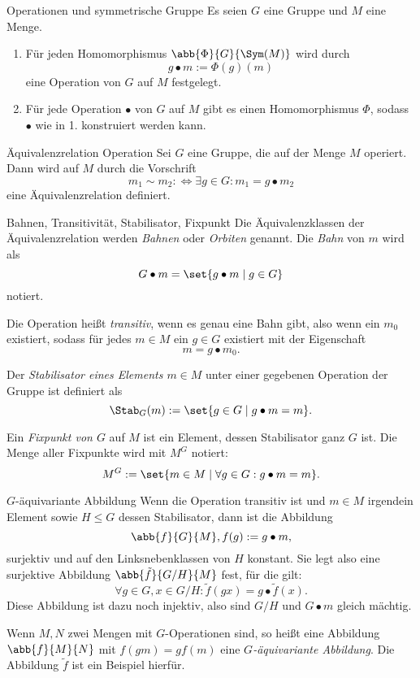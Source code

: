 \begin{karte}{Operationen und symmetrische Gruppe}
    Es seien \(G\) eine Gruppe und \(M\) eine Menge. 
    \begin{enumerate}
        \item Für jeden Homomorphismus \(\abb{\Phi}{G}{\Sym(M)}\) 
        wird durch 
        \[ g\bullet m := \Phi(g)(m) \]
        eine Operation von \(G\) auf \(M\) festgelegt. 
        \item Für jede Operation \(\bullet \) von 
        \(G\) auf \(M\) gibt es einen Homomorphismus \(\Phi\), 
        sodass \(\bullet\) wie in 1. konstruiert werden kann.
    \end{enumerate}
\end{karte}

\begin{karte}{Äquivalenzrelation Operation}
    Sei \(G\) eine Gruppe, die auf der Menge \(M\) operiert. Dann wird auf 
    \(M\) durch die Vorschrift 
    \[ m_1 \sim m_2 :\Leftrightarrow \exists g\in G: m_1 = g\bullet m_2 \]
    eine Äquivalenzrelation definiert.
\end{karte}

\begin{karte}{Bahnen, Transitivität, Stabilisator, Fixpunkt}
    Die Äquivalenzklassen der Äquivalenzrelation werden 
    \textit{Bahnen} oder \textit{Orbiten} genannt. Die \textit{Bahn} 
    von \(m\) wird als 
    \[ G\bullet m = \set{g\bullet m \;|\; g\in G} \]
    notiert.

    Die Operation heißt \textit{transitiv}, wenn es genau eine Bahn gibt, 
    also wenn ein \(m_0\) existiert, sodass für jedes \(m\in M\) ein 
    \(g\in G\) existiert mit der Eigenschaft 
    \[ m = g\bullet m_0. \]

    Der \textit{Stabilisator eines Elements \(m\in M\)} unter 
    einer gegebenen Operation der Gruppe ist definiert als 
    \[ \Stab_G(m) := \set{g\in G \;|\; g\bullet m = m}. \]

    Ein \textit{Fixpunkt von \(G\)} auf \(M\) ist ein Element, 
    dessen Stabilisator ganz \(G\) ist. Die Menge aller Fixpunkte 
    wird mit \(M^G\) notiert: 
    \[ M^G := \set{m\in M \;|\; \forall g\in G: g\bullet m=m}. \]
\end{karte}

\begin{karte}{\(G\)-äquivariante Abbildung}
    Wenn die Operation transitiv ist und \(m\in M\) irgendein 
    Element sowie \(H\leq G\) dessen Stabilisator, dann ist die Abbildung 
    \[ \abb{f}{G}{M}, f(g) := g\bullet m, \]
    surjektiv und auf den Linksnebenklassen von \(H\) konstant. 
    Sie legt also eine surjektive Abbildung 
    \(\abb{\tilde{f}}{G/H}{M}\) fest, für die gilt: 
    \[ \forall g\in G,x\in G/H: \tilde{f}(gx)=g\bullet \tilde{f}(x). \]
    Diese Abbildung ist dazu noch injektiv, also sind \(G/H\) und 
    \(G\bullet m\) gleich mächtig.

    Wenn \(M,N\) zwei Mengen mit \(G\)-Operationen sind, so heißt eine Abbildung 
    \( \abb{f}{M}{N} \) mit \(f(gm) = gf(m)\) eine \textit{\(G\)-äquivariante Abbildung}. Die Abbildung 
    \(\tilde{f}\) ist ein Beispiel hierfür.
\end{karte}

